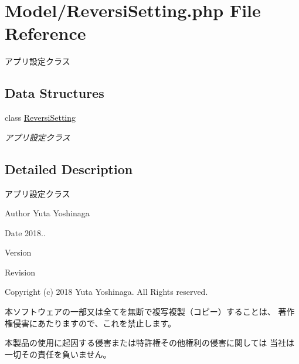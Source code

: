 \hypertarget{_reversi_setting_8php}{}\section{Model/\+Reversi\+Setting.php File Reference}
\label{_reversi_setting_8php}


アプリ設定クラス  


\subsection*{Data Structures}
\begin{DoxyCompactItemize}
\item 
class \hyperlink{class_reversi_setting}{Reversi\+Setting}
\begin{DoxyCompactList}\small\item\em アプリ設定クラス \end{DoxyCompactList}\end{DoxyCompactItemize}


\subsection{Detailed Description}
アプリ設定クラス 

\begin{DoxyAuthor}{Author}
Yuta Yoshinaga 
\end{DoxyAuthor}
\begin{DoxyDate}{Date}
2018.. 
\end{DoxyDate}
\begin{DoxyParagraph}{Version}

\end{DoxyParagraph}
\begin{DoxyParagraph}{Revision}

\end{DoxyParagraph}


Copyright (c) 2018 Yuta Yoshinaga. All Rights reserved.


\begin{DoxyItemize}
\item 本ソフトウェアの一部又は全てを無断で複写複製（コピー）することは、 著作権侵害にあたりますので、これを禁止します。
\item 本製品の使用に起因する侵害または特許権その他権利の侵害に関しては 当社は一切その責任を負いません。 
\end{DoxyItemize}